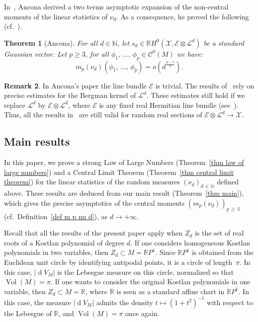 \documentclass[10pt]{amsart}
\newtheorem{theo}{Theorem}[section]
\theoremstyle{definition}\newtheorem{defi}[theo]{Definition}\newtheorem{rema}[theo]{Remark}\newtheorem{exam}[theo]{Example}\newtheorem{exem}[theo]{Example}\newtheorem{nota}[theo]{Notation}
\DeclareMathOperator{\dmesure}{d}
\DeclareMathOperator{\Vol}{Vol}
\newcommand{\E}{\mathcal{E}}
\newcommand{\X}{\mathcal{X}}
\renewcommand{\L}{\mathcal{L}}
\newcommand{\clC}{\mathcal{C}}
\newcommand{\N}{\mathbb{N}}
\newcommand{\R}{\mathbb{R}}
\newcommand{\norm}[1]{\left\lvert #1 \right\rvert}
\newcommand{\rmes}[1]{\norm{\dmesure\! V_{#1}}}
\newcommand{\vol}[1]{\Vol\!\left(#1\right)}
\renewcommand{\H}{H^0(\X,\E \otimes \L^d)}
\renewcommand{\geq}{\geqslant}
\begin{document}
In~\cite{Anc2019}, Ancona derived a two terms asymptotic expansion of the non-central moments of the linear statistics of $\nu_d$. As a consequence, he proved the following (cf.~\cite[Theorem~0.5]{Anc2019}).

\begin{theo}[{Ancona}]\label{thm non-central moments}
For all $d \in \N$, let $s_d \in \R\H$ be a standard Gaussian vector. Let $p \geq 3$, for all $\phi_1,\,\dots,\,\phi_p \in \clC^0(M)$ we have:
\[
m_p(\nu_d)(\phi_1,\,\dots,\,\phi_p)= o\left(d^\frac{p-1}{2}\right).
\]
\end{theo}

\begin{rema}\label{rem line bundle E}
In Ancona's paper the line bundle $\E$ is trivial. The results of~\cite{Anc2019} rely on precise estimates for the Bergman kernel of $\L^d$. These estimates still hold if we replace $\L^d$ by $\E \otimes \L^d$, where $\E$ is any fixed real Hermitian line bundle (see~\cite[Theorem~4.2.1]{MM2007}). Thus, all the results in~\cite{Anc2019} are still valid for random real sections of $\E \otimes \L^d \to \X$.
\end{rema}


\subsection{Main results}

In this paper, we prove a strong Law of Large Numbers (Theorem~\ref{thm law of large numbers}) and a Central Limit Theorem (Theorem~\ref{thm central limit theorem}) for the linear statistics of the random measures $(\nu_d)_{d\,\in\,\N}$ defined above. These results are deduced from our main result (Theorem~\ref{thm main}), which gives the precise asymptotics of the central moments $(m_p(\nu_d))_{p\,\geq\,3}$ (cf.~Definition~\ref{def m p nu d}), as $d \to +\infty$.

Recall that all the results of the present paper apply when $Z_d$ is the set of real roots of a Kostlan polynomial of degree $d$. If one considers homogeneous Kostlan polynomials in two variables, then $Z_d \subset M = \R P^1$. Since $\R P^1$ is obtained from the Euclidean unit circle by identifying antipodal points, it is a circle of length~$\pi$. In this case, $\rmes{M}$ is the Lebesgue measure on this circle, normalized so that $\vol{M}=\pi$. If one wants to consider the original Kostlan polynomials in one variable, then $Z_d \subset M = \R$, where $\R$ is seen as a standard affine chart in $\R P^1$. In this case, the measure $\rmes{M}$ admits the density $t \mapsto (1+t^2)^{-1}$ with respect to the Lebesgue of $\R$, and $\vol{M}=\pi$ once again.
\end{document}
